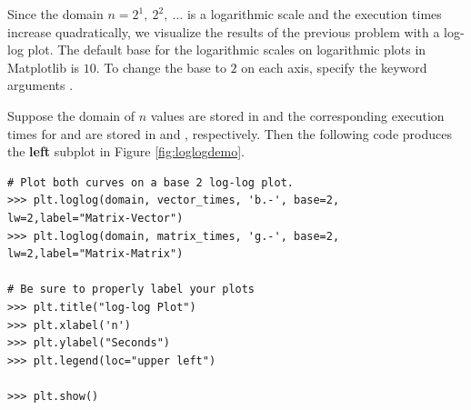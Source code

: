 Since the domain $n = 2^1,\ 2^2,\ \ldots$ is a logarithmic scale and the execution times increase quadratically, we visualize the results of the previous problem with a log-log plot.
The default base for the logarithmic scales on logarithmic plots in Matplotlib is $10$.
To change the base to $2$ on each axis, specify the keyword arguments .

Suppose the domain of $n$ values are stored in  and the corresponding execution times for  and  are stored in  and , respectively.
Then the following code produces the \textbf{left} subplot in Figure \ref{fig:loglogdemo}.

\begin{lstlisting}
# Plot both curves on a base 2 log-log plot.
>>> plt.loglog(domain, vector_times, 'b.-', base=2, lw=2,label="Matrix-Vector")
>>> plt.loglog(domain, matrix_times, 'g.-', base=2, lw=2,label="Matrix-Matrix")

# Be sure to properly label your plots
>>> plt.title("log-log Plot")
>>> plt.xlabel('n')
>>> plt.ylabel("Seconds")
>>> plt.legend(loc="upper left")

>>> plt.show()
\end{lstlisting}

